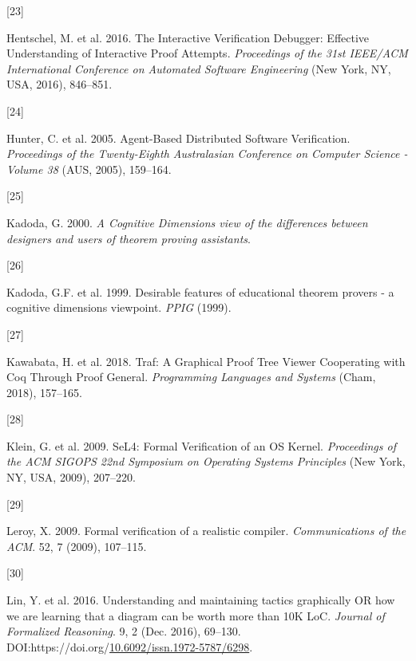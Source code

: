 \documentclass[
]{article}
\newlength{\cslhangindent}
\newlength{\csllabelwidth}
\newlength{\cslentryspacingunit} %
\newenvironment{CSLReferences}[2] %
 {%
  \setlength{\parindent}{0pt}
  \ifodd #1
  \let\oldpar\par
  \def\par{\hangindent=\cslhangindent\oldpar}
  \fi
  \setlength{\parskip}{#2\cslentryspacingunit}
 }%
 {}
\newcommand{\CSLLeftMargin}[1]{\parbox[t]{\csllabelwidth}{#1}}
\newcommand{\CSLRightInline}[1]{\parbox[t]{\linewidth - \csllabelwidth}{#1}\break}
\begin{document}
\begin{CSLReferences}{0}{0}
\leavevmode{}%
\CSLLeftMargin{{[}23{]} }
\CSLRightInline{Hentschel, M. et al. 2016. The {Interactive}
{Verification} {Debugger}: {Effective} {Understanding} of {Interactive}
{Proof} {Attempts}. \emph{Proceedings of the 31st {IEEE}/{ACM}
{International} {Conference} on {Automated} {Software} {Engineering}}
(New York, NY, USA, 2016), 846--851.}

\leavevmode{}%
\CSLLeftMargin{{[}24{]} }
\CSLRightInline{Hunter, C. et al. 2005. Agent-{Based} {Distributed}
{Software} {Verification}. \emph{Proceedings of the {Twenty}-{Eighth}
{Australasian} {Conference} on {Computer} {Science} - {Volume} 38} (AUS,
2005), 159--164.}

\leavevmode{}%
\CSLLeftMargin{{[}25{]} }
\CSLRightInline{Kadoda, G. 2000. \emph{A {Cognitive} {Dimensions} view
of the differences between designers and users of theorem proving
assistants}.}

\leavevmode{}%
\CSLLeftMargin{{[}26{]} }
\CSLRightInline{Kadoda, G.F. et al. 1999. Desirable features of
educational theorem provers - a cognitive dimensions viewpoint.
\emph{{PPIG}} (1999).}

\leavevmode{}%
\CSLLeftMargin{{[}27{]} }
\CSLRightInline{Kawabata, H. et al. 2018. Traf: {A} {Graphical} {Proof}
{Tree} {Viewer} {Cooperating} with {Coq} {Through} {Proof} {General}.
\emph{Programming {Languages} and {Systems}} (Cham, 2018), 157--165.}

\leavevmode{}%
\CSLLeftMargin{{[}28{]} }
\CSLRightInline{Klein, G. et al. 2009. {SeL4}: {Formal} {Verification}
of an {OS} {Kernel}. \emph{Proceedings of the {ACM} {SIGOPS} 22nd
{Symposium} on {Operating} {Systems} {Principles}} (New York, NY, USA,
2009), 207--220.}

\leavevmode{}%
\CSLLeftMargin{{[}29{]} }
\CSLRightInline{Leroy, X. 2009. Formal verification of a realistic
compiler. \emph{Communications of the ACM}. 52, 7 (2009), 107--115.}

\leavevmode{}%
\CSLLeftMargin{{[}30{]} }
\CSLRightInline{Lin, Y. et al. 2016. Understanding and maintaining
tactics graphically {OR} how we are learning that a diagram can be worth
more than {10K} {LoC}. \emph{Journal of Formalized Reasoning}. 9, 2
(Dec. 2016), 69--130.
DOI:https://doi.org/\href{https://doi.org/10.6092/issn.1972-5787/6298}{10.6092/issn.1972-5787/6298}.}


\end{CSLReferences}
\end{document}
